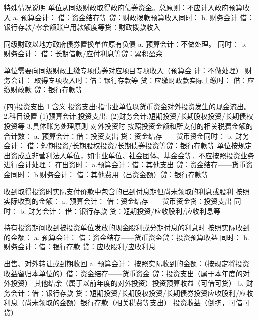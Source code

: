 \documentclass[UTF8,12pt]{ctexart}
\numberwithin{equation}{section} %
\numberwithin{figure}{section}
\numberwithin{table}{section}
\begin{document}
	特殊情况说明
	单位从同级财政取得政府债券资金。总原则：不应计入政府预算收入
	a.	预算会计： 借：资金结存等
	贷：财政拨款预算收入同时：
	b.	财务会计
	借：银行存款/零余额账户用款额度等贷：财政拨款收入
	
	
	同级财政以地方政府债券置换单位原有负债
	a.	预算会计：不做处理。 同时：
	b.	财务会计：
	借：长期借款/应付利息等贷：累积盈余
	
	
	单位需要向同级财政上缴专项债券对应项目专项收入（预算会 计：不做处理）
	财务会计：
	取得专项收入时：借：银行存款等
	贷：应缴财政款实际上缴时：
	借：应缴财政款 贷：银行存款等
	
	(四)投资支出
	1.含义
	投资支出:指事业单位以货币资金对外投资发生的现金流出。
	2.科目设置
	(1)预算会计:投资支出;
	(2)财务会计:短期投资/长期股权投资/长期债权投资等
	3.具体账务处理原则
	对外投资时
	按照投资金额和所支付的相关税费金额的合计数：
	a.	预算会计：借：投资支出
	贷：资金结存——货币资金同时：
	b.	财务会计：
	借：短期投资/长期股权投资/长期债券投资等贷：银行存款等
	单位按规定出资成立非营利法人单位，如事业单位、社会团体、基金会等，不应按照投资业务进行会计处理：
	在出资时： a.预算会计：借：其他支出
	贷：资金结存——货币资金同时：
	b.财务会计：
	借：其他费用（出资金额）贷：银行存款等
	
	收到取得投资时实际支付价款中包含的已到付息期但尚未领取的利息或股利
	按照实际收到的金额：
	a.	预算会计：
	借：资金结存——货币资金贷：投资支出
	同时：
	b.	财务会计：
	借：银行存款
	贷：短期投资/应收股利/应收利息等
	
	持有投资期间收到被投资单位发放的现金股利或分期付息的利息时
	按照实际收到的金额：
	a.	预算会计：
	借：资金结存——货币资金贷：投资预算收益
	同时：
	b.	财务会计：借：银行存款
	贷：应收股利/应收利息
	
	出售、对外转让或到期收回
	a.	预算会计：
	按照实际收到的金额：（按规定将投资收益留归本单位的）借：资金结存——货币资金
	贷：投资支出（属于本年度的对外投资） 其他结余（属于以前年度的对外投资）投资预算收益（可借可贷）
	b.	财务会计：借：银行存款
	贷：短期投资/长期股权投资/长期债券投资应收股利/应收利息（尚未领取的金额）银行存款（相关税费等支出）
	投资收益（倒挤，可借可贷）
	
\end{document}
